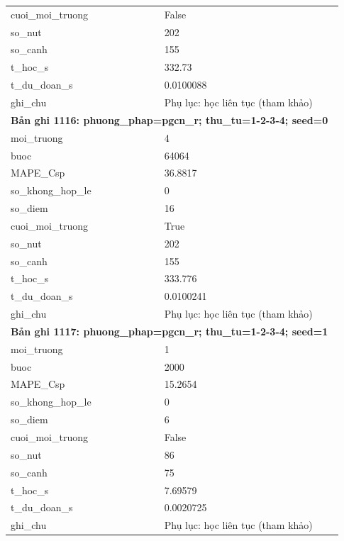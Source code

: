 \begin{longtable}{p{0.43\linewidth}p{0.50\linewidth}}
cuoi\_\allowbreak moi\_\allowbreak truong & False \\
so\_\allowbreak nut & 202 \\
so\_\allowbreak canh & 155 \\
t\_\allowbreak hoc\_\allowbreak s & 332.73 \\
t\_\allowbreak du\_\allowbreak doan\_\allowbreak s & 0.0100088 \\
ghi\_\allowbreak chu & Phụ lục: học liên tục (tham khảo) \\
\midrule
\multicolumn{2}{p{0.95\linewidth}}{\textbf{Bản ghi 1116: phuong\_phap=pgcn\_r; thu\_tu=1-2-3-4; seed=0}} \\
moi\_\allowbreak truong & 4 \\
buoc & 64064 \\
MAPE\_\allowbreak Csp & 36.8817 \\
so\_\allowbreak khong\_\allowbreak hop\_\allowbreak le & 0 \\
so\_\allowbreak diem & 16 \\
cuoi\_\allowbreak moi\_\allowbreak truong & True \\
so\_\allowbreak nut & 202 \\
so\_\allowbreak canh & 155 \\
t\_\allowbreak hoc\_\allowbreak s & 333.776 \\
t\_\allowbreak du\_\allowbreak doan\_\allowbreak s & 0.0100241 \\
ghi\_\allowbreak chu & Phụ lục: học liên tục (tham khảo) \\
\midrule
\multicolumn{2}{p{0.95\linewidth}}{\textbf{Bản ghi 1117: phuong\_phap=pgcn\_r; thu\_tu=1-2-3-4; seed=1}} \\
moi\_\allowbreak truong & 1 \\
buoc & 2000 \\
MAPE\_\allowbreak Csp & 15.2654 \\
so\_\allowbreak khong\_\allowbreak hop\_\allowbreak le & 0 \\
so\_\allowbreak diem & 6 \\
cuoi\_\allowbreak moi\_\allowbreak truong & False \\
so\_\allowbreak nut & 86 \\
so\_\allowbreak canh & 75 \\
t\_\allowbreak hoc\_\allowbreak s & 7.69579 \\
t\_\allowbreak du\_\allowbreak doan\_\allowbreak s & 0.0020725 \\
ghi\_\allowbreak chu & Phụ lục: học liên tục (tham khảo) \\

\end{longtable}
